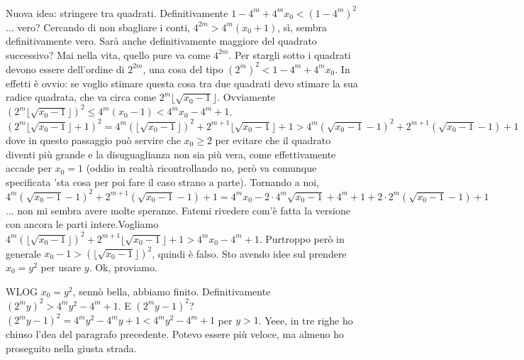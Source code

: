 \begin{sol}
  Nuova idea: stringere tra quadrati. Definitivamente $1-4^m+4^mx_0<(1-4^m)^2$... vero? Cercando di non sbagliare i conti, $4^{2m}>4^m(x_0+1)$, sì, sembra definitivamente vero. Sarà anche definitivamente maggiore del quadrato successivo? Mai nella vita, quello pure va come $4^{2m}$. Per stargli sotto i quadrati devono essere dell'ordine di $2^{2m}$, una cosa del tipo $(2^m)^2 < 1-4^m+4^mx_0$. In effetti è ovvio: se voglio stimare questa cosa tra due quadrati devo stimare la sua radice quadrata, che va circa come $2^m\lfloor\sqrt{x_0-1}\rfloor$. Ovviamente $(2^m\lfloor\sqrt{x_0-1}\rfloor)^2 \le 4^m(x_0-1)<4^mx_0-4^m+1$.
  $(2^m\lfloor\sqrt{x_0-1}\rfloor+1)^2=4^m(\lfloor\sqrt{x_0-1}\rfloor)^2+2^{m+1}\lfloor\sqrt{x_0-1}\rfloor+1 > 4^m(\sqrt{x_0-1}-1)^2+2^{m+1}(\sqrt{x_0-1}-1)+1$ dove in questo passaggio può servire che $x_0 \ge 2$ per evitare che il quadrato diventi più grande e la disuguaglianza non sia più vera, come effettivamente accade per $x_0=1$ (oddio in realtà ricontrollando no, però va comunque specificata 'sta cosa per poi fare il caso strano a parte).
  Tornando a noi, $4^m(\sqrt{x_0-1}-1)^2+2^{m+1}(\sqrt{x_0-1}-1)+1=4^mx_0-2\cdot4^m\sqrt{x_0-1}+4^m+1+2\cdot2^m(\sqrt{x_0-1}-1)+1$... non mi sembra avere molte speranze. Fatemi rivedere com'è fatta la versione con ancora le parti intere.Vogliamo $4^m(\lfloor\sqrt{x_0-1}\rfloor)^2+2^{m+1}\lfloor\sqrt{x_0-1}\rfloor+1 > 4^mx_0-4^m+1$.
  Purtroppo però in generale $x_0-1>(\lfloor\sqrt{x_0-1}\rfloor)^2$, quindi è falso. Sto avendo idee sul prendere $x_0=y^2$ per usare $y$. Ok, proviamo.

  WLOG $x_0=y^2$, sennò bella, abbiamo finito. Definitivamente $(2^my)^2>4^my^2-4^m+1$. E $(2^my-1)^2$? $(2^my-1)^2 =4^my^2-4^my+1<4^my^2-4^m+1$ per $y>1$. Yeee, in tre righe ho chiuso l'dea del paragrafo precedente. Potevo essere più veloce, ma almeno ho proseguito nella giusta strada.
\end{sol}
